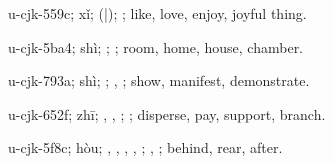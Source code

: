 \begin{multicols}{2}
{\cjkgGlue{}u-cjk-559c; xǐ; \cjkgGlue{}\cjkgGlue{}(\cjkgGlue{}|\cjkgGlue{}); \cjkgGlue{}; like, love, enjoy, joyful thing.

\cjkgGlue{}u-cjk-5ba4; shì; \cjkgGlue{}; \cjkgGlue{}; room, home, house, chamber.

\cjkgGlue{}u-cjk-793a; shì; \cjkgGlue{}\cjkgGlue{}\cjkgGlue{}; \cjkgGlue{}, \cjkgGlue{}; show, manifest, demonstrate.

\cjkgGlue{}u-cjk-652f; zhī; \cjkgGlue{}\cjkgGlue{}\cjkgGlue{}, \cjkgGlue{}\cjkgGlue{}\cjkgGlue{}, \cjkgGlue{}\cjkgGlue{}\cjkgGlue{}; \cjkgGlue{}; disperse, pay, support, branch.

\cjkgGlue{}u-cjk-5f8c; hòu; \cjkgGlue{}, \cjkgGlue{}\cjkgGlue{}\cjkgGlue{}, \cjkgGlue{}, \cjkgGlue{}, \cjkgGlue{}\cjkgGlue{}\cjkgGlue{}; \cjkgGlue{}, \cjkgGlue{}; behind, rear, after.

}
\end{multicols}
